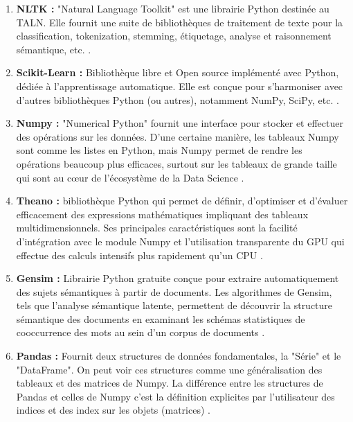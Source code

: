             \begin{enumerate}[leftmargin=*]
                \item{\textbf{NLTK : }}
                "Natural Language Toolkit" est une librairie Python destinée au TALN. Elle fournit une suite de bibliothèques de traitement de texte pour la classification, tokenization, stemming, étiquetage, analyse et raisonnement sémantique, etc. \cite{nltk}.\\

                \item{\textbf{Scikit-Learn : }\label{scikit-learn}}
                Bibliothèque libre et Open source implémenté avec Python, dédiée à l'apprentissage automatique. Elle est conçue pour s'harmoniser avec d'autres bibliothèques Python (ou autres), notamment NumPy, SciPy, etc. \cite{scikit}.\\

                \item{\textbf{Numpy : }}
                "Numerical Python" fournit une interface pour stocker et effectuer des opérations sur les données. D'une certaine manière, les tableaux Numpy sont comme les listes en Python, mais Numpy permet de rendre les opérations beaucoup plus efficaces, surtout sur les tableaux de grande taille qui sont au cœur de l'écosystème de la Data Science \cite{numpy}.\\

                \item{\textbf{Theano : }}
                bibliothèque Python qui permet de définir, d'optimiser et d'évaluer efficacement des expressions mathématiques impliquant des tableaux multidimensionnels. Ses principales caractéristiques sont la facilité d'intégration avec le module Numpy et l'utilisation transparente du GPU qui effectue des calculs intensifs plus rapidement qu'un CPU \cite{theano}.\\
                
                \item{\textbf{Gensim : }}
                Librairie Python gratuite conçue pour extraire automatiquement des sujets sémantiques à partir de documents. Les algorithmes de Gensim, tels que l'analyse sémantique latente, permettent de découvrir la structure sémantique des documents en examinant les schémas statistiques de cooccurrence des mots au sein d'un corpus de documents \cite{gensim}.\\

                \item{\textbf{Pandas : }}
                Fournit deux structures de données fondamentales, la "Série" et le "DataFrame". On peut voir ces structures comme une généralisation des tableaux et des matrices de Numpy. La différence entre les structures de Pandas et celles de Numpy c'est la définition explicites par l'utilisateur des indices et des index sur les objets (matrices) .\cite{pandas}\\


\end{enumerate}
